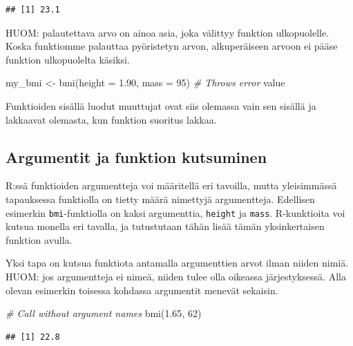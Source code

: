 \documentclass[
]{book}
\newenvironment{Shaded}{\begin{snugshade}}{\end{snugshade}}
\newcommand{\AttributeTok}[1]{\textcolor[rgb]{0.77,0.63,0.00}{#1}}
\newcommand{\CommentTok}[1]{\textcolor[rgb]{0.56,0.35,0.01}{\textit{#1}}}
\newcommand{\DecValTok}[1]{\textcolor[rgb]{0.00,0.00,0.81}{#1}}
\newcommand{\FloatTok}[1]{\textcolor[rgb]{0.00,0.00,0.81}{#1}}
\newcommand{\FunctionTok}[1]{\textcolor[rgb]{0.00,0.00,0.00}{#1}}
\newcommand{\NormalTok}[1]{#1}
\newcommand{\OtherTok}[1]{\textcolor[rgb]{0.56,0.35,0.01}{#1}}
\begin{document}
\begin{verbatim}
## [1] 23.1
\end{verbatim}

HUOM: palautettava arvo on ainoa asia, joka välittyy funktion ulkopuolelle. Koska funktiomme palauttaa pyöristetyn arvon, alkuperäiseen arvoon ei pääse funktion ulkopuolelta käsiksi.

\begin{Shaded}
\begin{Highlighting}[]
\NormalTok{my\_bmi }\OtherTok{\textless{}{-}} \FunctionTok{bmi}\NormalTok{(}\AttributeTok{height =} \FloatTok{1.90}\NormalTok{, }\AttributeTok{mass =} \DecValTok{95}\NormalTok{)}
\CommentTok{\# Throws error}
\NormalTok{value}
\end{Highlighting}
\end{Shaded}

Funktioiden sisällä luodut muuttujat ovat siis olemassa vain sen sisällä ja lakkaavat olemasta, kun funktion suoritus lakkaa.

\hypertarget{argumentit-ja-funktion-kutsuminen}{%
\subsection{Argumentit ja funktion kutsuminen}\label{argumentit-ja-funktion-kutsuminen}}

R:ssä funktioiden argumentteja voi määritellä eri tavoilla, mutta yleisimmässä tapauksessa funktiolla on tietty määrä nimettyjä argumentteja. Edellisen esimerkin \texttt{bmi}-funktiolla on kaksi argumenttia, \texttt{height} ja \texttt{mass}. R-kunktioita voi kutsua monella eri tavalla, ja tutustutaan tähän lisää tämän yksinkertaisen funktion avulla.

Yksi tapa on kutsua funktiota antamalla argumenttien arvot ilman niiden nimiä. HUOM: jos argumentteja ei nimeä, niiden tulee olla oikeassa järjestyksessä. Alla olevan esimerkin toisessa kohdassa argumentit menevät sekaisin.

\begin{Shaded}
\begin{Highlighting}[]
\CommentTok{\# Call without argument names}
\FunctionTok{bmi}\NormalTok{(}\FloatTok{1.65}\NormalTok{, }\DecValTok{62}\NormalTok{)}
\end{Highlighting}
\end{Shaded}

\begin{verbatim}
## [1] 22.8
\end{verbatim}
\end{document}
